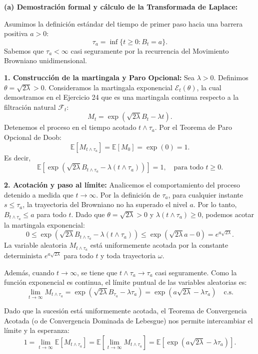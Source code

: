 \documentclass[11pt, letterpaper]{article}
\begin{document}
\begin{solucion}
    \vspace{3mm}
    \textbf{(a) Demostración formal y cálculo de la Transformada de Laplace:}

    Asumimos la definición estándar del tiempo de primer paso hacia una barrera positiva $a > 0$: 
    \[ \tau_a = \inf\{t \ge 0 : B_t = a\}. \]
    Sabemos que $\tau_a < \infty$ casi seguramente por la recurrencia del Movimiento Browniano unidimensional.

    \textbf{1. Construcción de la martingala y Paro Opcional:}
    Sea $\lambda > 0$. Definimos $\theta = \sqrt{2\lambda} > 0$. 
    Consideramos la martingala exponencial $\mathcal{E}_t(\theta)$, la cual demostramos en el Ejercicio 24 que es una martingala continua respecto a la filtración natural $\mathcal{F}_t$:
    \[ M_t = \exp\left( \sqrt{2\lambda} B_t - \lambda t \right). \]
    Detenemos el proceso en el tiempo acotado $t \wedge \tau_a$. Por el Teorema de Paro Opcional de Doob:
    \[ \mathbb{E}[M_{t \wedge \tau_a}] = \mathbb{E}[M_0] = \exp(0) = 1. \]
    Es decir,
    \[ \mathbb{E}\left[ \exp\left( \sqrt{2\lambda} B_{t \wedge \tau_a} - \lambda (t \wedge \tau_a) \right) \right] = 1, \quad \text{para todo } t \ge 0. \]

    \textbf{2. Acotación y paso al límite:}
    Analicemos el comportamiento del proceso detenido a medida que $t \to \infty$.
    Por la definición de $\tau_a$, para cualquier instante $s \le \tau_a$, la trayectoria del Browniano no ha superado el nivel $a$. Por lo tanto, $B_{t \wedge \tau_a} \le a$ para todo $t$.
    Dado que $\theta = \sqrt{2\lambda} > 0$ y $\lambda (t \wedge \tau_a) \ge 0$, podemos acotar la martingala exponencial:
    \[ 0 \le \exp\left( \sqrt{2\lambda} B_{t \wedge \tau_a} - \lambda (t \wedge \tau_a) \right) \le \exp\left( \sqrt{2\lambda} a - 0 \right) = e^{a\sqrt{2\lambda}}. \]
    La variable aleatoria $M_{t \wedge \tau_a}$ está uniformemente acotada por la constante determinista $e^{a\sqrt{2\lambda}}$ para todo $t$ y toda trayectoria $\omega$.
    
    Además, cuando $t \to \infty$, se tiene que $t \wedge \tau_a \to \tau_a$ casi seguramente. Como la función exponencial es continua, el límite puntual de las variables aleatorias es:
    \[ \lim_{t \to \infty} M_{t \wedge \tau_a} = \exp\left( \sqrt{2\lambda} B_{\tau_a} - \lambda \tau_a \right) = \exp\left( a\sqrt{2\lambda} - \lambda \tau_a \right) \quad \text{c.s.} \]
    
    Dado que la sucesión está uniformemente acotada, el Teorema de Convergencia Acotada (o de Convergencia Dominada de Lebesgue) nos permite intercambiar el límite y la esperanza:
    \[ 1 = \lim_{t \to \infty} \mathbb{E}[M_{t \wedge \tau_a}] = \mathbb{E}\left[ \lim_{t \to \infty} M_{t \wedge \tau_a} \right] = \mathbb{E}\left[ \exp\left( a\sqrt{2\lambda} - \lambda \tau_a \right) \right]. \]


\end{solucion}
\end{document}

